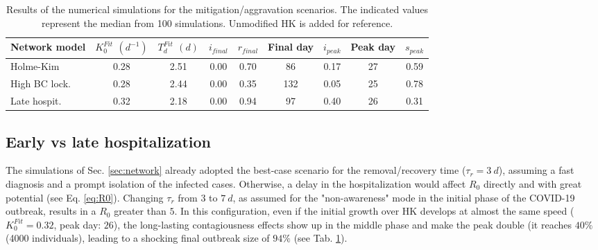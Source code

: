 \documentclass[DIV=12, BCOR=0pt]{scrartcl}  %
\begin{document}
	\begin{table}[h]
		\centering
		\caption{Results of the numerical simulations for the mitigation/aggravation scenarios. The indicated values represent the median from 100 simulations. Unmodified HK is added for reference.}
		\label{tab:lock_results}
		\begin{tabular}{lcccccccc}
			\toprule
			Network model & $K_0^{Fit}$ $(d^{-1})$ & $T_d^{Fit}$ $(d)$ & $i_{final}$ & $r_{final}$ & Final day & $i_{peak}$  & Peak day & $s_{peak}$\\
			\midrule
			Holme-Kim 		&    0.28 &   2.51 &  0.00 &  0.70 &  	 86 &  0.17 &   27 &	0.59 \\
			High BC lock.	&    0.28 &   2.44 &  0.00 &  0.35 & 		132 &  0.05 &   25 &	0.78 \\
			Late hospit.  & 	 0.32 &   2.18 &  0.00 &  0.94 &     97 &  0.40 &   26 &  0.31 \\
			
			\bottomrule
		\end{tabular}
	\end{table}
	
	
	\subsection{Early vs late hospitalization}
	The simulations of Sec. \ref{sec:network} already adopted the best-case scenario for the removal/recovery time ($\tau_{r} = 3 \ d$), assuming a fast diagnosis and a prompt isolation of the infected cases. 
	Otherwise, a delay in the hospitalization would affect $R_0$ directly and with great potential (see Eq. \ref{eq:R0}). Changing $\tau_{r}$ from $3$ to $7 \ d$, as assumed for the "non-awareness" mode in the initial phase of the COVID-19 outbreak, results in a $R_0$ greater than $5$. In this configuration, even if the initial growth over HK develops at almost the same speed ($K^{Fit}_0 = 0.32$, peak day: $26$), the long-lasting contagiousness effects show up in the middle phase and make the peak double (it reaches $40 \%$ (4000 individuals), leading to a shocking final outbreak size of $94 \%$ (see Tab. \ref{tab:lock_results}). 
	
\end{document}
